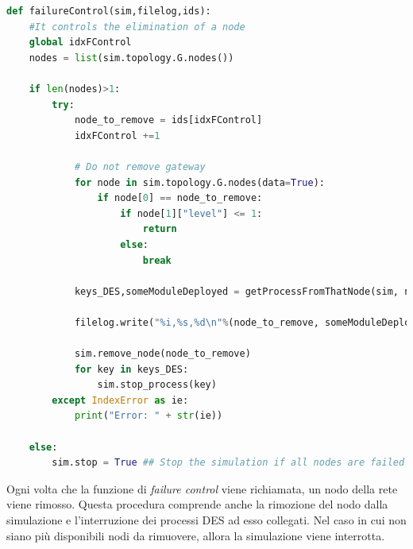 \begin{lstlisting}[language=python, caption={Funzione di \textit{failure control}}, label={lst:failure_control}, captionpos=b]
def failureControl(sim,filelog,ids):
    #It controls the elimination of a node
    global idxFControl
    nodes = list(sim.topology.G.nodes())

    if len(nodes)>1:
        try:
            node_to_remove = ids[idxFControl]
            idxFControl +=1
            
            # Do not remove gateway 
            for node in sim.topology.G.nodes(data=True):
                if node[0] == node_to_remove:
                    if node[1]["level"] <= 1:
                        return
                    else: 
                        break

            keys_DES,someModuleDeployed = getProcessFromThatNode(sim, node_to_remove)

            filelog.write("%i,%s,%d\n"%(node_to_remove, someModuleDeployed,sim.env.now))

            sim.remove_node(node_to_remove)
            for key in keys_DES:
                sim.stop_process(key)
        except IndexError as ie:
            print("Error: " + str(ie))

    else:
        sim.stop = True ## Stop the simulation if all nodes are failed
\end{lstlisting}

Ogni volta che la funzione di \textit{failure control} viene richiamata, un nodo della rete viene rimosso. Questa procedura comprende anche la rimozione del nodo dalla simulazione e l'interruzione dei processi DES ad esso collegati. Nel caso in cui non siano più disponibili nodi da rimuovere, allora la simulazione viene interrotta.



